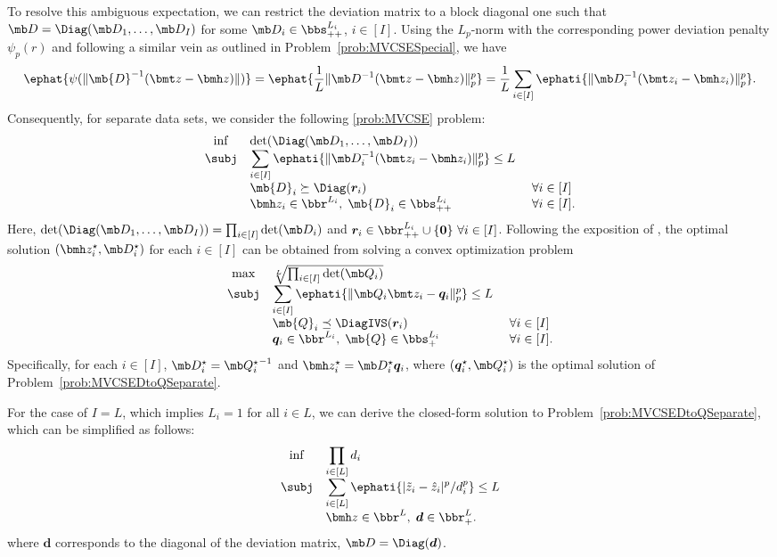 \documentclass[opre, blindrev]{informs4}
\newcommand{\1}[1]{\mathds{1}{\left(#1\right)}}
\begin{document}
To resolve this ambiguous expectation, we can restrict the deviation matrix to a block diagonal one such that $\mb D = \Diag(\mb D_1,\dots, \mb D_I)$ for some $\mb D_i \in \bbs^{L_i}_{++}$, $i \in [I]$. Using the $L_p$-norm with the corresponding power deviation penalty $\psi_p(r)$ and following a similar vein as outlined in Problem~\eqref{prob:MVCSESpecial}, we have 
$$
\ephat{\psi(\|\mb{D}^{-1}(\bmt z - \bmh z)\|)} = \ephat{\frac{1}{L} \| \mb D^{-1}(\bmt z - \bmh z) \|^p_p} = \displaystyle  \frac{1}{L} \sum_{i \in [I]} \ephati{\| \mb D_i^{-1}(\bmt z_i - \bmh z_i) \|^p_p}.
$$
Consequently, for separate data sets, we consider the following \ref{prob:MVCSE} problem:
\[
\begin{array}{cll}
\inf & \det(\Diag(\mb D_1,\dots,\mb D_I)) \\
\subj & \displaystyle \sum_{i \in [I]} \ephati{\| \mb D_i^{-1}(\bmt z_i - \bmh z_i) \|^p_p}\leq L \\
& \mb{D}_i \succeq \Diag(\bm r_i) &~\forall i\in [I] \\
& \bmh z_i \in \bbr^{L_i}, \; \mb{D}_i \in \bbs^{L_i}_{++} &~\forall i \in [I].  
\end{array} 
\]
Here,
$\det(\Diag(\mb D_1,\dots,\mb D_I)) = \prod_{i \in [I]} \det(\mb D_i)$ and $\bm r_i \in \bbr^{L_i}_{++} \cup\{\bm 0\} ~ \forall i \in [I]$.
Following the exposition of , the  optimal solution $(\bmh z^\star_i, \mb D^\star_i)$ for each $i \in [I]$ can be obtained from solving a convex optimization problem
\begin{equation}
\label{prob:MVCSEDtoQSeparate}
\begin{array}{cll}
\max & \sqrt[L]{\prod_{i\in [I]} \det(\mb Q_i)} \\
\subj & \displaystyle \sum_{i \in [I]} \ephati{\| \mb Q_i\bmt z_i - \bm q_i \|^p_p}\leq L \\
& \mb{Q}_i \preceq \DiagIVS(\bm r_i) &~\forall i \in [I]\\
& \bm q_i \in \bbr^{L_i}, \; \mb{Q} \in \bbs^{L_i}_{+} &~\forall i \in [I].  
\end{array} 
\end{equation}
Specifically, for each $i \in [I]$, $\mb D_i^\star = {\mb Q^\star_i}^{-1}$ and $\bmh z^\star_i = \mb D^\star_i \bm q_i$, where $(\bm q^\star_i, \mb Q_i^\star)$ is the optimal solution of Problem~\eqref{prob:MVCSEDtoQSeparate}. 

For the case of $I=L$, which implies $L_i = 1$ for all $i \in L$, we can derive the closed-form solution to Problem~\eqref{prob:MVCSEDtoQSeparate}, which can be simplified as follows:
\begin{equation}
\label{prob:MVCSESpecialDiagonal}
\begin{array}{cll}
\inf & \displaystyle \prod_{i \in [L]}d_i \\
\subj & \displaystyle\sum_{i \in [L]}\ephati{|\tilde z_i - \hat z_i|^p/d^p_i} \leq L \\
& \bmh z \in \bbr^L, \; \bm  d \in \bbr^L_+.  
\end{array} 
\end{equation}
where $\bm d$ corresponds to  the diagonal of the deviation matrix, \ie $\mb D = \Diag(\bm d)$. 
\end{document}
